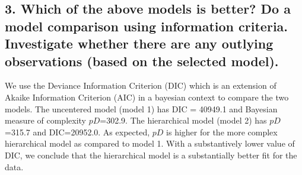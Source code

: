 \documentclass[12pt]{article}
\begin{document}


    








\subsection{3. Which of the above models is better? Do a model comparison using information criteria. Investigate whether there are any outlying observations (based on the selected model).}

We use the Deviance Information Criterion (DIC) which is an extension of Akaike Information Criterion (AIC) in a bayesian context to compare the two models. The uncentered model (model 1) has DIC = 40949.1 and Bayesian measure of complexity $pD$=302.9. The hierarchical model (model 2) has $pD$=315.7 and DIC=20952.0. As expected, $pD$ is higher for the more complex hierarchical model as compared to model 1. With a substantively lower value of DIC, we conclude that the hierarchical model is a substantially better fit for the data. 
\end{document}
